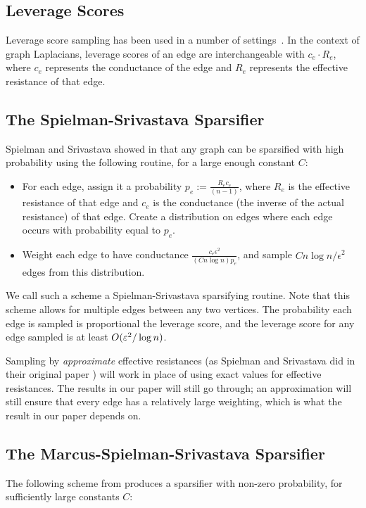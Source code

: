 \subsection{Leverage Scores}
Leverage score sampling has been used in a number of
settings~\cite{SpielmanS08, KelnerL13, Pachocki16, KyngPPS16,
  ChuGPSSW18}. In the context of graph Laplacians, leverage scores of an
edge are interchangeable with $c_e \cdot R_e$, where $c_e$ represents
the conductance of the edge and $R_e$ represents the effective
resistance of that edge.

\subsection{The Spielman-Srivastava Sparsifier}

Spielman and Srivastava showed in \cite{SpielmanS08} that any graph can be sparsified with high probability using the following routine, for a large enough constant $C$: 

\begin{itemize}
\item For each edge, assign it a probability $p_e := \frac{R_ec_e}{(n-1)}$, where $R_e$ is the effective resistance of that edge and $c_e$ is the conductance (the inverse of the actual resistance) of that edge. Create a distribution on edges where each edge occurs with probability equal to $p_e$.
\item Weight each edge to have conductance $\frac{c_e\epsilon^2}{(C n \log n) p_e}$, and sample $Cn \log n/\epsilon^2$ edges from this distribution.
\end{itemize}

We call such a scheme a Spielman-Srivastava sparsifying routine. Note
that this scheme allows for multiple edges between any two vertices.
The probability each edge is sampled is proportional the leverage score,
    and the leverage score for any edge sampled is at least
    $O(\varepsilon^2 / \log n)$.

\begin{remark} Sampling by \textit{approximate} effective resistances (as Spielman and Srivastava did in their original paper \cite{SpielmanS08}) will work in place of using exact values for effective resistances. The results in our paper will still go through; an approximation will still ensure that every edge has a relatively large weighting, which is what the result in our paper depends on.
\end{remark}

\subsection{The Marcus-Spielman-Srivastava Sparsifier}
The following scheme from \cite{Srivastava13} produces a sparsifier with non-zero probability, for sufficiently large constants $C$:

